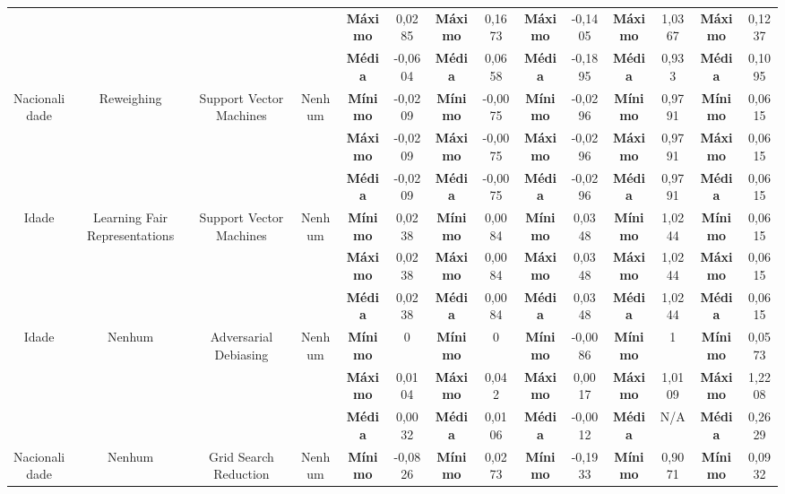 \documentclass[Portugues,Final]{ic-tese-v3}
\begin{document}
\begin{table}[H]
\begin{center}
{\begin{tabular}{c|c|c|c|c|c|c|c|c|c|c|c|c|c}
             & & & & \textbf{Máximo} & 0,0285 & \textbf{Máximo} & 0,1673 & \textbf{Máximo} & -0,1405 & \textbf{Máximo} & 1,0367 & \textbf{Máximo} & 0,1237 \\
             & & & & \textbf{Média} & -0,0604 & \textbf{Média} & 0,0658 & \textbf{Média} & -0,1895 & \textbf{Média} & 0,933 & \textbf{Média} & 0,1095 \\
            \hline
            \multirow{3}{*}{Nacionalidade} & \multirow{3}{*}{Reweighing} & \multirow{3}{*}{Support Vector Machines} & \multirow{3}{*}{Nenhum} & \textbf{Mínimo} & -0,0209 & \textbf{Mínimo} & -0,0075 & \textbf{Mínimo} & -0,0296 & \textbf{Mínimo} & 0,9791 & \textbf{Mínimo} & 0,0615 \\
             & & & & \textbf{Máximo} & -0,0209 & \textbf{Máximo} & -0,0075 & \textbf{Máximo} & -0,0296 & \textbf{Máximo} & 0,9791 & \textbf{Máximo} & 0,0615 \\
             & & & & \textbf{Média} & -0,0209 & \textbf{Média} & -0,0075 & \textbf{Média} & -0,0296 & \textbf{Média} & 0,9791 & \textbf{Média} & 0,0615 \\
            \hline
            \multirow{3}{*}{Idade} & \multirow{3}{*}{Learning Fair Representations} & \multirow{3}{*}{Support Vector Machines} & \multirow{3}{*}{Nenhum} & \textbf{Mínimo} & 0,0238 & \textbf{Mínimo} & 0,0084 & \textbf{Mínimo} & 0,0348 & \textbf{Mínimo} & 1,0244 & \textbf{Mínimo} & 0,0615 \\
             & & & & \textbf{Máximo} & 0,0238 & \textbf{Máximo} & 0,0084 & \textbf{Máximo} & 0,0348 & \textbf{Máximo} & 1,0244 & \textbf{Máximo} & 0,0615 \\
             & & & & \textbf{Média} & 0,0238 & \textbf{Média} & 0,0084 & \textbf{Média} & 0,0348 & \textbf{Média} & 1,0244 & \textbf{Média} & 0,0615 \\
            \hline
            \multirow{3}{*}{Idade} & \multirow{3}{*}{Nenhum} & \multirow{3}{*}{Adversarial Debiasing} & \multirow{3}{*}{Nenhum} & \textbf{Mínimo} & 0 & \textbf{Mínimo} & 0 & \textbf{Mínimo} & -0,0086 & \textbf{Mínimo} & 1 & \textbf{Mínimo} & 0,0573 \\
             & & & & \textbf{Máximo} & 0,0104 & \textbf{Máximo} & 0,042 & \textbf{Máximo} & 0,0017 & \textbf{Máximo} & 1,0109 & \textbf{Máximo} & 1,2208 \\
             & & & & \textbf{Média} & 0,0032 & \textbf{Média} & 0,0106 & \textbf{Média} & -0,0012 & \textbf{Média} & N/A & \textbf{Média} & 0,2629 \\
            \hline
            \multirow{3}{*}{Nacionalidade} & \multirow{3}{*}{Nenhum} & \multirow{3}{*}{Grid Search Reduction} & \multirow{3}{*}{Nenhum} & \textbf{Mínimo} & -0,0826 & \textbf{Mínimo} & 0,0273 & \textbf{Mínimo} & -0,1933 & \textbf{Mínimo} & 0,9071 & \textbf{Mínimo} & 0,0932 \\

\end{tabular}}
\end{center}
\end{table}
\end{document}
